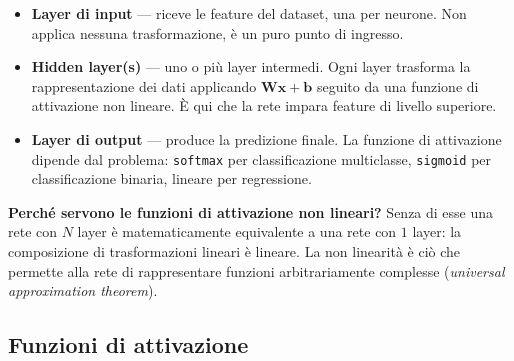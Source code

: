 \documentclass[11pt,a4paper]{article}
\newcommand{\fnt}{\texttt}     %
\begin{document}
\begin{itemize}
    \item \textbf{Layer di input} --- riceve le feature del dataset, una
          per neurone. Non applica nessuna trasformazione, è un puro
          punto di ingresso.
    \item \textbf{Hidden layer(s)} --- uno o più layer intermedi. Ogni
          layer trasforma la rappresentazione dei dati applicando
          $\bm{W}\bm{x} + \bm{b}$ seguito da una funzione di attivazione
          non lineare. È qui che la rete impara feature di livello
          superiore.
    \item \textbf{Layer di output} --- produce la predizione finale. La
          funzione di attivazione dipende dal problema: \fnt{softmax}
          per classificazione multiclasse, \fnt{sigmoid} per
          classificazione binaria, lineare per regressione.
\end{itemize}

\textbf{Perché servono le funzioni di attivazione non lineari?} Senza di
esse una rete con $N$ layer è matematicamente equivalente a una rete con
$1$ layer: la composizione di trasformazioni lineari è lineare. La non
linearità è ciò che permette alla rete di rappresentare funzioni
arbitrariamente complesse (\emph{universal approximation theorem}).

\subsection{Funzioni di attivazione}
\end{document}
